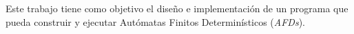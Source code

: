 Este trabajo tiene como objetivo el diseño e implementación de un programa que pueda construir y ejecutar Autómatas Finitos Determinísticos (\emph{AFDs}).